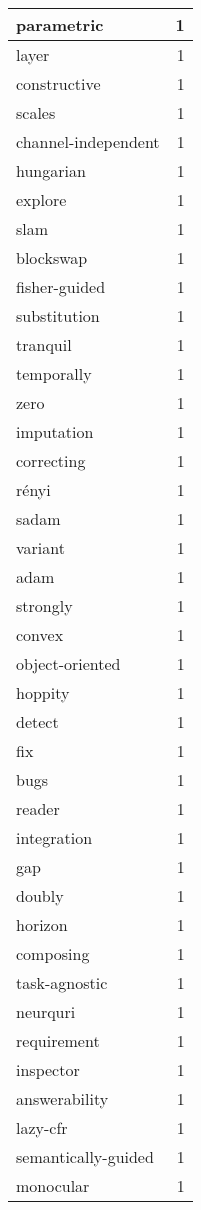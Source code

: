 \begin{table}[h]
\begin{tabular}{|l|r|}
\hline
parametric & 1 \\
\hline
layer & 1 \\
\hline
constructive & 1 \\
\hline
scales & 1 \\
\hline
channel-independent & 1 \\
\hline
hungarian & 1 \\
\hline
explore & 1 \\
\hline
slam & 1 \\
\hline
blockswap & 1 \\
\hline
fisher-guided & 1 \\
\hline
substitution & 1 \\
\hline
tranquil & 1 \\
\hline
temporally & 1 \\
\hline
zero & 1 \\
\hline
imputation & 1 \\
\hline
correcting & 1 \\
\hline
rényi & 1 \\
\hline
sadam & 1 \\
\hline
variant & 1 \\
\hline
adam & 1 \\
\hline
strongly & 1 \\
\hline
convex & 1 \\
\hline
object-oriented & 1 \\
\hline
hoppity & 1 \\
\hline
detect & 1 \\
\hline
fix & 1 \\
\hline
bugs & 1 \\
\hline
reader & 1 \\
\hline
integration & 1 \\
\hline
gap & 1 \\
\hline
doubly & 1 \\
\hline
horizon & 1 \\
\hline
composing & 1 \\
\hline
task-agnostic & 1 \\
\hline
neurquri & 1 \\
\hline
requirement & 1 \\
\hline
inspector & 1 \\
\hline
answerability & 1 \\
\hline
lazy-cfr & 1 \\
\hline
semantically-guided & 1 \\
\hline
monocular & 1 \\

\end{tabular}
\end{table}
